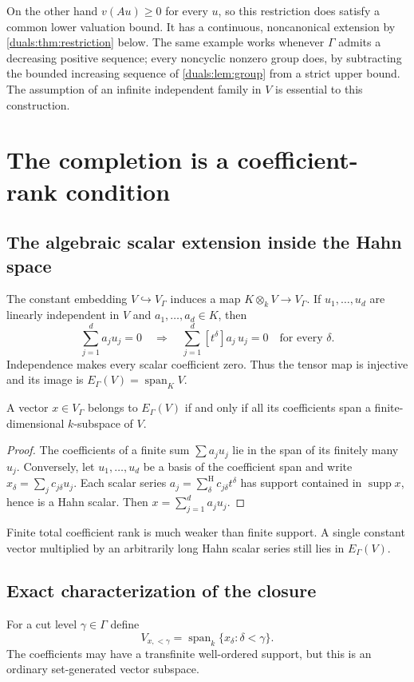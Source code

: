 \documentclass[11pt,letterpaper]{article}
\numberwithin{equation}{section}
\theoremstyle{definition}
\theoremstyle{remark}
\newcommand{\supp}{\operatorname{supp}}
\newcommand{\Span}{\operatorname{span}}
\newcommand{\sH}{\mathop{\sum}\nolimits^{\mathrm H}}
\begin{document}
On the other hand $v(Au)\ge0$ for every $u$, so this restriction does
satisfy a common lower valuation bound. It has a continuous, noncanonical
extension by \cref{duals:thm:restriction} below. The same example works
whenever $\Gamma$ admits a decreasing positive sequence; every noncyclic
nonzero group does, by subtracting the bounded increasing sequence of
\cref{duals:lem:group} from a strict upper bound. The assumption of an
infinite independent family in $V$ is essential to this construction.

\section{The completion is a coefficient-rank condition}
\label{duals:sec:completion}

\subsection{The algebraic scalar extension inside the Hahn space}
The constant embedding $V\hookrightarrow V_\Gamma$ induces a map
$K\otimes_kV\to V_\Gamma$. If $u_1,\ldots,u_d$ are linearly independent
in $V$ and $a_1,\ldots,a_d\in K$, then
\[
 \sum_{j=1}^d a_ju_j=0
 \quad\Longrightarrow\quad
 \sum_{j=1}^d[t^\delta]a_j\,u_j=0\quad\text{for every }\delta.
\]
Independence makes every scalar coefficient zero. Thus the tensor map is
injective and its image is $E_\Gamma(V)=\Span_KV$.

\begin{proposition}\label{duals:prop:algebraic}
A vector $x\in V_\Gamma$ belongs to $E_\Gamma(V)$ if and only if all
its coefficients span a finite-dimensional $k$-subspace of $V$.
\end{proposition}
\begin{proof}
The coefficients of a finite sum $\sum a_ju_j$ lie in the span of its
finitely many $u_j$. Conversely, let $u_1,\ldots,u_d$ be a basis of the
coefficient span and write $x_\delta=\sum_j c_{j\delta}u_j$.
Each scalar series $a_j=\sH_\delta c_{j\delta}t^\delta$ has support
contained in $\supp x$, hence is a Hahn scalar. Then
$x=\sum_{j=1}^da_ju_j$.
\end{proof}

Finite total coefficient rank is much weaker than finite support. A
single constant vector multiplied by an arbitrarily long Hahn scalar
series still lies in $E_\Gamma(V)$.

\subsection{Exact characterization of the closure}
For a cut level $\gamma\in\Gamma$ define
\[
 V_{x,<\gamma}=\Span_k\{x_\delta:\delta<\gamma\}.
\]
The coefficients may have a transfinite well-ordered support, but this
is an ordinary set-generated vector subspace.
\end{document}
